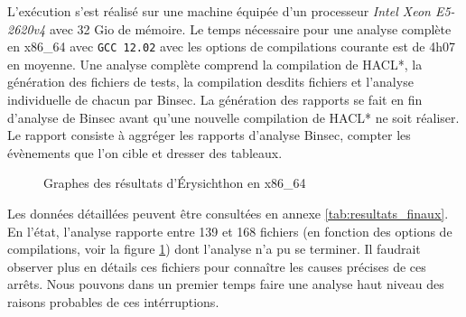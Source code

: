L'exécution s'est réalisé sur une machine équipée d'un processeur \textit{Intel Xeon E5-2620v4} avec 32 Gio de mémoire. Le temps nécessaire pour une analyse complète en x86\_64 avec \texttt{GCC 12.02} avec les options de compilations courante est de 4h07 en moyenne. Une analyse complète comprend la compilation de HACL*, la génération des fichiers de tests, la compilation desdits fichiers et l'analyse individuelle de chacun par Binsec. La génération des rapports se fait en fin d'analyse de Binsec avant qu'une nouvelle compilation de HACL* ne soit réaliser. Le rapport consiste à aggréger les rapports d'analyse Binsec, compter les évènements que l'on cible et dresser des tableaux.\bigbreak

\begin{figure}[!ht]
  \centering
  \caption{Graphes des résultats d'Érysichthon en x86\_64}
  \label{fig:graphe_total}
\end{figure}


Les données détaillées peuvent être consultées en annexe \ref{tab:resultats_finaux}. En l'état, l'analyse rapporte entre 139 et 168 fichiers (en fonction des options de compilations, voir la figure \ref{fig:graphe_total}) dont l'analyse n'a pu se terminer. Il faudrait observer plus en détails ces fichiers pour connaître les causes précises de ces arrêts. Nous pouvons dans un premier temps faire une analyse haut niveau des raisons probables de ces intérruptions. \medbreak

